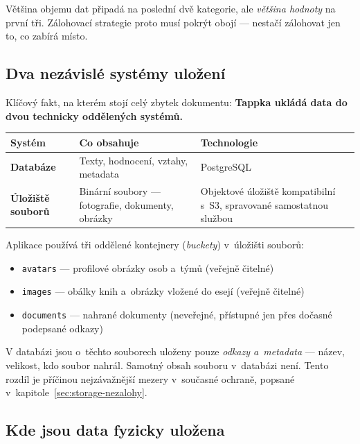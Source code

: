 \documentclass[11pt,a4paper]{article}
\begin{document}
Většina objemu dat připadá na poslední dvě kategorie, ale \emph{většina hodnoty} na první tři.
Zálohovací strategie proto musí pokrýt obojí --- nestačí zálohovat jen to, co zabírá místo.

\subsection{Dva nezávislé systémy uložení}
\label{sec:dva-systemy}

Klíčový fakt, na kterém stojí celý zbytek dokumentu: \textbf{Tappka ukládá data do dvou technicky
oddělených systémů.}

\begin{center}
\begin{tabularx}{\textwidth}{@{}p{3.5cm}p{4.2cm}X@{}}
\toprule
\textbf{Systém} & \textbf{Co obsahuje} & \textbf{Technologie} \\
\midrule
\textbf{Databáze} & Texty, hodnocení, vztahy, metadata & PostgreSQL \\
\textbf{Úložiště souborů} & Binární soubory --- fotografie, dokumenty, obrázky & Objektové úložiště kompatibilní s~S3, spravované samostatnou službou \\
\bottomrule
\end{tabularx}
\end{center}

Aplikace používá tři oddělené kontejnery (\emph{buckety}) v~úložišti souborů:

\begin{itemize}
  \item \texttt{avatars} --- profilové obrázky osob a~týmů (veřejně čitelné)
  \item \texttt{images} --- obálky knih a~obrázky vložené do esejí (veřejně čitelné)
  \item \texttt{documents} --- nahrané dokumenty (neveřejné, přístupné jen přes dočasné
        podepsané odkazy)
\end{itemize}

V databázi jsou o~těchto souborech uloženy pouze \emph{odkazy a~metadata} --- název, velikost,
kdo soubor nahrál. Samotný obsah souboru v~databázi není. Tento rozdíl je příčinou nejzávažnější
mezery v~současné ochraně, popsané v~kapitole~\ref{sec:storage-nezalohy}.

\subsection{Kde jsou data fyzicky uložena}
\label{sec:lokalita}
\end{document}
